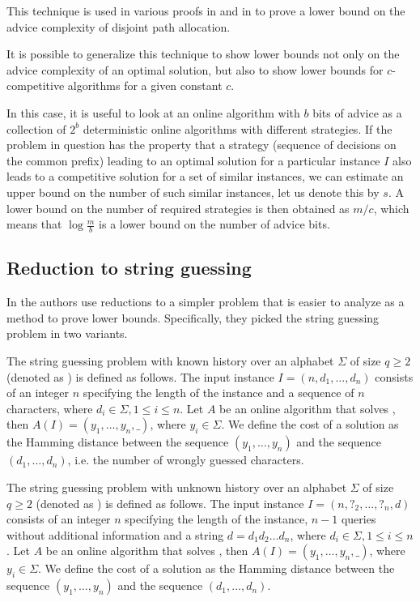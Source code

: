 This technique is used in various proofs in \cite{misof-trivial-graphs}
and in \cite{komm-thesis} to prove a lower bound on the advice complexity
of disjoint path allocation.

It is possible to generalize this technique to show lower bounds not only
on the advice complexity of an optimal solution, but also to show lower
bounds for $c$-competitive algorithms for a given constant $c$.

In this case, it is useful to look at an online algorithm with $b$ bits of
advice as a collection of $2^b$ deterministic online algorithms with
different strategies. If the problem in question has the property that a
strategy (sequence of decisions on the common prefix) leading to an
optimal solution for a particular instance $I$ also leads to a competitive
solution for a set of similar instances, we can estimate an upper bound on
the number of such similar instances, let us denote this by $s$. A lower
bound on the number of required strategies is then obtained as $m/c$,
which means that $\log\frac{m}{b}$ is a lower bound on the number of
advice bits.

\subsection{Reduction to string guessing}

In \cite{string-guessing} the authors use reductions to a simpler problem
that is easier to analyze as a method to prove lower bounds. Specifically,
they picked the string guessing problem in two variants.

\begin{definition}
    The string guessing problem with known history over an alphabet
    $\Sigma$ of size $q \geq 2$ (denoted as ) is defined as
    follows. The input instance $I = (n, d_1, \dots, d_n)$ consists of an
    integer $n$ specifying the length of the instance and a sequence of
    $n$ characters, where $d_i \in \Sigma, 1 \leq i \leq n$. Let $A$ be an
    online algorithm that solves , then $A(I) = (y_1, \dots, y_n,
    \_)$, where $y_i \in \Sigma$. We define the cost of a solution as the
    Hamming distance between the sequence $(y_1, \dots, y_n)$ and the
    sequence $(d_1, \dots, d_n)$, i.e. the number of wrongly guessed
    characters.
\end{definition}

\begin{definition}
    The string guessing problem with unknown history over an alphabet
    $\Sigma$ of size $q \geq 2$ (denoted as ) is defined as
    follows. The input instance $I = (n, ?_2, \dots, ?_n, d)$ consists of
    an integer $n$ specifying the length of the instance, $n-1$ queries
    without additional information and a string $d = d_1d_2\dots{}d_n$,
    where $d_i \in \Sigma, 1 \leq i \leq n$. Let $A$ be an online
    algorithm that solves , then $A(I) = (y_1, \dots, y_n, \_)$,
    where $y_i \in \Sigma$. We define the cost of a solution as the
    Hamming distance between the sequence $(y_1, \dots, y_n)$ and the
    sequence $(d_1, \dots, d_n)$.
\end{definition}


